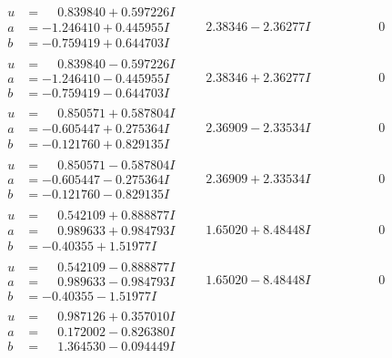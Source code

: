 \documentclass[1p]{elsarticle_modified}
\theoremstyle{definition}
\begin{document}
$$\begin{array}{c|c|c}
\begin{aligned}
u &= \phantom{-}0.839840 + 0.597226 I \\
a &= -1.246410 + 0.445955 I \\
b &= -0.759419 + 0.644703 I\end{aligned}
 & \phantom{-}2.38346 - 2.36277 I & \phantom{-0.000000 } 0 \\ \hline\begin{aligned}
u &= \phantom{-}0.839840 - 0.597226 I \\
a &= -1.246410 - 0.445955 I \\
b &= -0.759419 - 0.644703 I\end{aligned}
 & \phantom{-}2.38346 + 2.36277 I & \phantom{-0.000000 } 0 \\ \hline\begin{aligned}
u &= \phantom{-}0.850571 + 0.587804 I \\
a &= -0.605447 + 0.275364 I \\
b &= -0.121760 + 0.829135 I\end{aligned}
 & \phantom{-}2.36909 - 2.33534 I & \phantom{-0.000000 } 0 \\ \hline\begin{aligned}
u &= \phantom{-}0.850571 - 0.587804 I \\
a &= -0.605447 - 0.275364 I \\
b &= -0.121760 - 0.829135 I\end{aligned}
 & \phantom{-}2.36909 + 2.33534 I & \phantom{-0.000000 } 0 \\ \hline\begin{aligned}
u &= \phantom{-}0.542109 + 0.888877 I \\
a &= \phantom{-}0.989633 + 0.984793 I \\
b &= -0.40355 + 1.51977 I\end{aligned}
 & \phantom{-}1.65020 + 8.48448 I & \phantom{-0.000000 } 0 \\ \hline\begin{aligned}
u &= \phantom{-}0.542109 - 0.888877 I \\
a &= \phantom{-}0.989633 - 0.984793 I \\
b &= -0.40355 - 1.51977 I\end{aligned}
 & \phantom{-}1.65020 - 8.48448 I & \phantom{-0.000000 } 0 \\ \hline\begin{aligned}
u &= \phantom{-}0.987126 + 0.357010 I \\
a &= \phantom{-}0.172002 - 0.826380 I \\
b &= \phantom{-}1.364530 - 0.094449 I\end{aligned}

\end{array}$$
\end{document}
